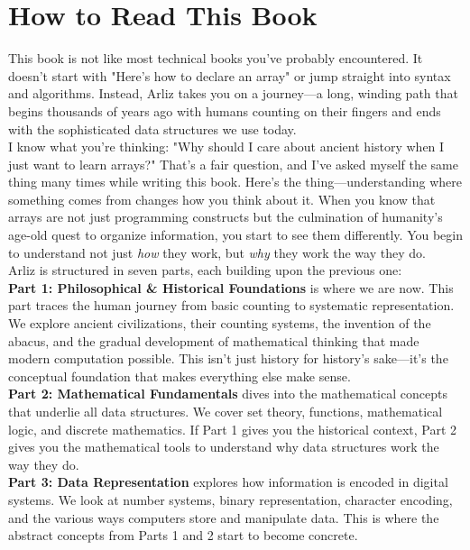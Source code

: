 \documentclass[12pt, oneside, openany]{book}
\begin{document}
	\tableofcontents
	\renewcommand{\arraystretch}{1.5} %
\mainmatter
\chapter*{How to Read This Book}

This book is not like most technical books you've probably encountered. It doesn't start with "Here's how to declare an array" or jump straight into syntax and algorithms. Instead, Arliz takes you on a journey—a long, winding path that begins thousands of years ago with humans counting on their fingers and ends with the sophisticated data structures we use today.\\
I know what you're thinking: "Why should I care about ancient history when I just want to learn arrays?" That's a fair question, and I've asked myself the same thing many times while writing this book. Here's the thing—understanding where something comes from changes how you think about it. When you know that arrays are not just programming constructs but the culmination of humanity's age-old quest to organize information, you start to see them differently. You begin to understand not just \emph{how} they work, but \emph{why} they work the way they do.\\
Arliz is structured in seven parts, each building upon the previous one:\\
\textbf{Part 1: Philosophical \& Historical Foundations} is where we are now. This part traces the human journey from basic counting to systematic representation. We explore ancient civilizations, their counting systems, the invention of the abacus, and the gradual development of mathematical thinking that made modern computation possible. This isn't just history for history's sake—it's the conceptual foundation that makes everything else make sense.\\
\textbf{Part 2: Mathematical Fundamentals} dives into the mathematical concepts that underlie all data structures. We cover set theory, functions, mathematical logic, and discrete mathematics. If Part 1 gives you the historical context, Part 2 gives you the mathematical tools to understand why data structures work the way they do.\\
\textbf{Part 3: Data Representation} explores how information is encoded in digital systems. We look at number systems, binary representation, character encoding, and the various ways computers store and manipulate data. This is where the abstract concepts from Parts 1 and 2 start to become concrete.\\
\end{document}
